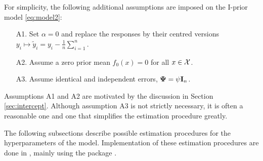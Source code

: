 For simplicity, the following additional assumptions are imposed on the I-prior model \eqref{eq:model2}:
\begin{enumerate}
  \item[A1.] Set $\alpha = 0$ and replace the responses by their centred versions $y_i \mapsto \tilde y_i = y_i - \frac{1}{n}\sum_{i=1}^n$.  
  \item[A2.] Assume a zero prior mean $f_0(x) = 0$ for all $x\in{\mathcal X}$.
  \item[A3.] Assume identical and independent errors, ${\bm\Psi} = \psi{\mathbf I}_n$.
\end{enumerate}
Assumptions A1 and A2 are motivated by the discussion in Section \ref{sec:intercept}.
Although assumption A3 is not strictly necessary, it is often a reasonable one and one that simplifies the estimation procedure greatly.

The following subsections describe possible estimation procedures for the hyperparameters of the model.
Implementation of these estimation procedures are  done in , mainly using the  package \citep{jamil2017}.


%
%
%


